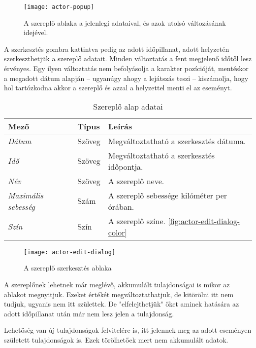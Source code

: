 \begin{figure}[h!]
	\centering
	\texttt{[image: actor-popup]}
	\caption{A szereplő ablaka a jelenlegi adataival, és azok utolsó változásának idejével.}
	\label{fig:actor-popup}
\end{figure}

A szerkesztés gombra kattintva pedig az adott időpillanat, adott helyzetén szerkeszthetjük a szereplő adatait. Minden változtatás a fent megjelenő időtől lesz érvényes. Egy ilyen változtatás nem befolyásolja a karakter pozícióját, mentéskor a megadott dátum alapján -- ugyanúgy ahogy a lejátszás teszi -- kiszámolja, hogy hol tartózkodna akkor a szereplő és azzal a helyzettel menti el az eseményt.

\begin{table}[H]
	\centering
	\begin{tabular}{ | m{} | m{} | m{} | }
		\hline
		\textbf{Mező} & \textbf{Típus} & \textbf{Leírás} \\
		\hline \hline
		\emph{Dátum} & Szöveg & Megváltoztatható a szerkesztés dátuma. \\
		\hline
		\emph{Idő} & Szöveg & Megváltoztatható a szerkesztés időpontja. \\
		\hline
		\emph{Név} & Szöveg & A szereplő neve.  \\
		\hline
		\emph{Maximális sebesség} & Szám & A szereplő sebessége kilóméter per órában. \\
		\hline
		\emph{Szín} & Szín & A szereplő színe. \ref{fig:actor-edit-dialog-color}  \\
		\hline
	\end{tabular}
	\caption{Szereplő alap adatai}
	\label{tab:create-project-form}
\end{table}

\begin{figure}[h!]
	\centering
	\texttt{[image: actor-edit-dialog]}
	\caption{A szereplő szerkesztés ablaka}
	\label{fig:actor-edit-dialog}
\end{figure}

A szereplőnek lehetnek már meglévő, akkumulált tulajdonságai is mikor az ablakot megnyitjuk. Ezeket értékét megváltoztathatjuk, de kitörölni itt nem tudjuk, ugyanis nem itt születtek. De "elfelejthetjük" őket aminek hatására az adott időpillanat után már nem lesz jelen a tulajdonság.

Lehetőség van új tulajdonságok felvitelére is, itt jelennek meg az adott eseményen született tulajdonságok is. Ezek törölhetőek mert nem akkumulált adatok.

